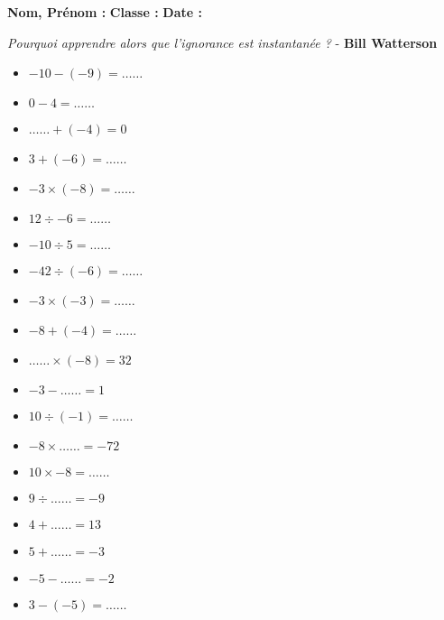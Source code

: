   \vspace{1cm}

  \textbf{Nom, Prénom :} \hspace{8cm} \textbf{Classe :} \hspace{3cm} \textbf{Date :}\\

  \vspace{-0.5cm} \begin{center}
    \textit{Pourquoi apprendre alors que l’ignorance est instantanée ?}  - \textbf{ Bill Watterson}
  \end{center}  \vspace{-0.5cm} 

\begin{multicols}{3}\noindent
    \begin{itemize}[label={$\bullet$}]
        \item $-10 - \left( -9\right) = \ldots\ldots$
        \item $0 - 4 = \ldots\ldots$
        \item $\ldots\ldots + \left( -4\right) = 0$
        \item $3 + \left( -6\right) = \ldots\ldots$
        \item $-3 \times \left( -8\right) = \ldots\ldots$
        \item $12 \div -6 = \ldots\ldots$
        \item $-10 \div 5 = \ldots\ldots$
        \item $-42 \div \left( -6\right) = \ldots\ldots$
        \item $-3 \times \left( -3\right) = \ldots\ldots$
        \item $-8 + \left( -4\right) = \ldots\ldots$
        \item $\ldots\ldots \times \left( -8\right) = 32$
        \item $-3 - \ldots\ldots = 1$
        \item $10 \div \left( -1\right) = \ldots\ldots$
        \item $-8 \times \ldots\ldots = -72$
        \item $10 \times -8 = \ldots\ldots$
        \item $9 \div \ldots\ldots = -9$
        \item $4 + \ldots\ldots = 13$
        \item $5 + \ldots\ldots = -3$
        \item $-5 - \ldots\ldots = -2$
        \item $3 - \left( -5\right) = \ldots\ldots$
    \end{itemize}
  \end{multicols}

